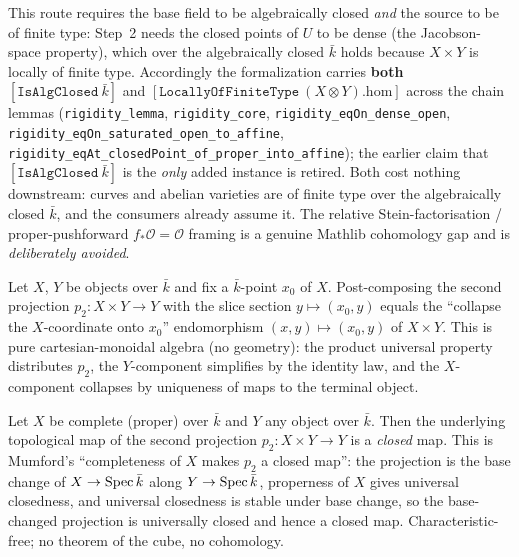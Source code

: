 \begin{remark}
  This route requires the base field to be algebraically closed \emph{and} the source to be of finite
  type: Step~2 needs the closed points of \(U\) to be dense (the Jacobson-space property), which over
  the algebraically closed \(\bar k\) holds because \(X \times Y\) is locally of finite type.
  Accordingly the formalization carries \textbf{both} \([\mathtt{IsAlgClosed}\ \bar k]\) and
  \([\mathtt{LocallyOfFiniteType}\ (X \otimes Y).\mathrm{hom}]\) across the chain lemmas
  (\texttt{rigidity\_lemma}, \texttt{rigidity\_core}, \texttt{rigidity\_eqOn\_dense\_open},
  \texttt{rigidity\_eqOn\_saturated\_open\_to\_affine},
  \texttt{rigidity\_eqAt\_closedPoint\_of\_proper\_into\_affine}); the earlier claim that
  \([\mathtt{IsAlgClosed}\ \bar k]\) is the \emph{only} added instance is retired. Both cost nothing
  downstream: curves and abelian varieties are of finite type over the algebraically closed \(\bar k\),
  and the consumers already assume it. The relative Stein-factorisation / proper-pushforward
  \(f_*\mathcal O = \mathcal O\) framing is a genuine Mathlib cohomology gap and is \emph{deliberately
  avoided}.
\end{remark}
\begin{lemma}
  \label{lem:rigidity_snd_lift}
  Let \(X\), \(Y\) be objects over \(\bar k\) and fix a \(\bar k\)-point \(x_0\) of \(X\).
  Post-composing the second projection \(p_2 \colon X \times Y \to Y\) with the slice section
  \(y \mapsto (x_0, y)\) equals the ``collapse the \(X\)-coordinate onto \(x_0\)'' endomorphism
  \((x, y) \mapsto (x_0, y)\) of \(X \times Y\). This is pure cartesian-monoidal algebra (no
  geometry): the product universal property distributes \(p_2\), the \(Y\)-component simplifies by
  the identity law, and the \(X\)-component collapses by uniqueness of maps to the terminal object.
\end{lemma}
\begin{lemma}
  \label{lem:snd_left_isClosedMap}
  Let \(X\) be complete (proper) over \(\bar k\) and \(Y\) any object over \(\bar k\). Then the
  underlying topological map of the second projection \(p_2 \colon X \times Y \to Y\) is a
  \emph{closed} map. This is Mumford's ``completeness of \(X\) makes \(p_2\) a closed map'': the
  projection is the base change of \(X \to \operatorname{Spec} \bar k\) along \(Y \to \operatorname{Spec} \bar k\), properness
  of \(X\) gives universal closedness, and universal closedness is stable under base change, so the
  base-changed projection is universally closed and hence a closed map. Characteristic-free; no
  theorem of the cube, no cohomology.
\end{lemma}
